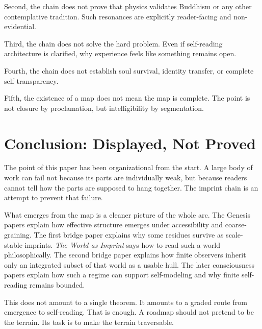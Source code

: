 \documentclass[12pt]{article}
\begin{document}
Second, the chain does not prove that physics validates Buddhism or any other contemplative tradition. Such resonances are explicitly reader-facing and non-evidential.

Third, the chain does not solve the hard problem. Even if self-reading architecture is clarified, why experience feels like something remains open.

Fourth, the chain does not establish soul survival, identity transfer, or complete self-transparency.

Fifth, the existence of a map does not mean the map is complete. The point is not closure by proclamation, but intelligibility by segmentation.

\section{Conclusion: Displayed, Not Proved}

The point of this paper has been organizational from the start. A large body of work can fail not because its parts are individually weak, but because readers cannot tell how the parts are supposed to hang together. The imprint chain is an attempt to prevent that failure.

What emerges from the map is a cleaner picture of the whole arc. The Genesis papers explain how effective structure emerges under accessibility and coarse-graining. The first bridge paper explains why some residues survive as scale-stable imprints. \emph{The World as Imprint} says how to read such a world philosophically. The second bridge paper explains how finite observers inherit only an integrated subset of that world as a usable hull. The later consciousness papers explain how such a regime can support self-modeling and why finite self-reading remains bounded.

This does not amount to a single theorem. It amounts to a graded route from emergence to self-reading. That is enough. A roadmap should not pretend to be the terrain. Its task is to make the terrain traversable.
\end{document}
